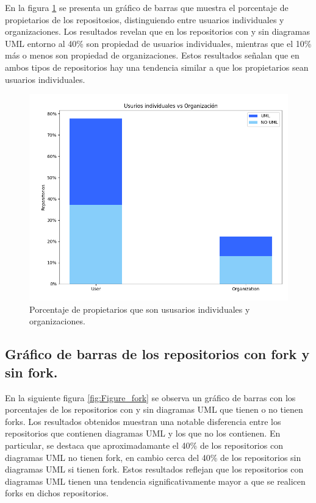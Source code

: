 \documentclass[a4paper, 12pt]{book}
\begin{document}
En la figura \ref{fig:Figure_typeDeveloper} se presenta un gráfico de barras que muestra el porcentaje de propietarios de los repositosios, distinguiendo entre usuarios individuales y organizaciones. 
Los resultados revelan que en los repositorios con y sin diagramas UML entorno al 40\% son propiedad de usuarios individuales, mientras que el 10\% más o menos son propiedad de organizaciones.
Estos resultados señalan que en ambos tipos de repositorios hay una tendencia similar a que los propietarios sean usuarios individuales.


\begin{figure}
  \centering
  \includegraphics[width=12cm, keepaspectratio]{img/Figure_typeDeveloper.png}
  \caption{Porcentaje de propietarios que son ususarios individuales y organizaciones.}\label{fig:Figure_typeDeveloper}
\end{figure}


\subsection{Gráfico de barras de los repositorios con fork y sin fork.}
\label{sec:Gráfico de barras de los repositorios con fork y sin forks}
En la siguiente figura \ref{fig:Figure_fork} se observa un gráfico de barras con los porcentajes de  los repositorios con y sin diagramas UML que tienen o no tienen forks.
Los resultados obtenidos muestran una notable disferencia entre los repositorios que contienen diagramas UML y los que no los contienen.
En particular, se destaca que aproximadamante el 40\% de los repositorios con diagramas UML no tienen fork, en cambio cerca del 40\% de los repositorios sin diagramas UML si tienen fork.
Estos resultados reflejan que los repositorios con diagramas UML tienen una tendencia significativamente mayor a que se realicen forks en dichos repositorios.
\end{document}
